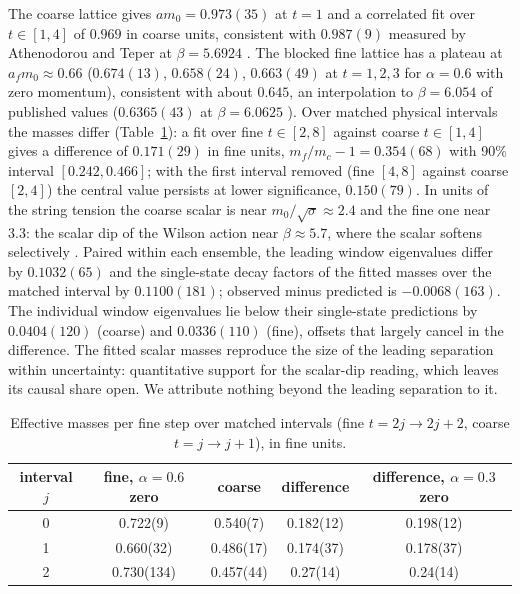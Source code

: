 \documentclass[11pt]{article}
\begin{document}
The coarse lattice gives $am_0=0.973(35)$ at $t=1$ and a correlated fit over $t\in[1,4]$ of $0.969$ in
coarse units, consistent with $0.987(9)$ measured by Athenodorou and Teper at $\beta=5.6924$
\cite{AthenodorouTeper2020}. The blocked fine lattice has a plateau at $a_fm_0\approx0.66$
($0.674(13)$, $0.658(24)$, $0.663(49)$ at $t=1,2,3$ for $\alpha=0.6$ with zero momentum), consistent with
about $0.645$, an interpolation to $\beta=6.054$ of published values ($0.6365(43)$ at $\beta=6.0625$
\cite{AthenodorouTeper2020}). Over matched physical intervals the masses
differ (Table~\ref{tab:masses}): a fit over fine $t\in[2,8]$ against coarse $t\in[1,4]$ gives a
difference of $0.171(29)$ in fine units, $m_f/m_c-1=0.354(68)$ with 90\% interval $[0.242,0.466]$; with the
first interval removed (fine $[4,8]$ against coarse $[2,4]$) the central value persists at lower
significance, $0.150(79)$. In units of the string tension the coarse scalar is near $m_0/\sqrt\sigma\approx2.4$
and the fine one near $3.3$: the scalar dip of the Wilson action near $\beta\approx5.7$, where the scalar
softens selectively \cite{Bhanot1982,Heller1995,AthenodorouTeper2020}. Paired within each ensemble,
the leading window eigenvalues differ by $0.1032(65)$ and the single-state decay factors of the fitted
masses over the matched interval by $0.1100(181)$; observed minus predicted is $-0.0068(163)$. The
individual window eigenvalues lie below their single-state predictions by $0.0404(120)$ (coarse) and
$0.0336(110)$ (fine), offsets that largely cancel in the difference. The fitted scalar masses reproduce the
size of the leading separation within uncertainty: quantitative support for the scalar-dip reading,
which leaves its causal share open. We attribute nothing beyond the leading separation to it.

\begin{table}[t]
\centering
\begin{tabular}{@{}ccccc@{}}
\toprule
interval $j$ & fine, $\alpha=0.6$ zero & coarse & difference & difference, $\alpha=0.3$ zero \\
\midrule
0 & 0.722(9) & 0.540(7) & 0.182(12) & 0.198(12) \\
1 & 0.660(32) & 0.486(17) & 0.174(37) & 0.178(37) \\
2 & 0.730(134) & 0.457(44) & 0.27(14) & 0.24(14) \\
\bottomrule
\end{tabular}
\caption{Effective masses per fine step over matched intervals (fine $t=2j\to2j+2$, coarse
$t=j\to j+1$), in fine units.}
\label{tab:masses}
\end{table}
\end{document}
